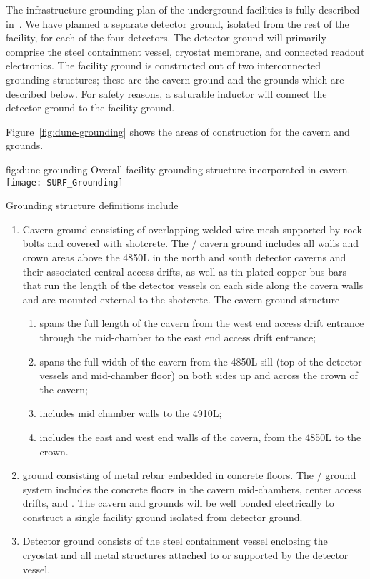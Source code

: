 The infrastructure grounding plan of the underground facilities is
fully described in~\cite{bib:cernedms2095975}. %
We have planned a separate detector ground, isolated from the rest of the facility, for each of the four detectors.  %
The detector ground will primarily 
comprise the steel containment vessel, cryostat membrane, and
connected readout electronics.  The facility ground is constructed out
of two interconnected grounding structures; these are the cavern
ground and the  grounds which are described below.  For safety
reasons, a saturable inductor will connect the detector ground to the
facility ground.

Figure~\ref{fig:dune-grounding} shows the areas of construction for
the cavern and  grounds.
\begin{dunefigure}{fig:dune-grounding}
  {Overall  facility grounding structure incorporated in cavern.}
  \texttt{[image: SURF\_Grounding]}
\end{dunefigure}
Grounding structure definitions include 
\begin{enumerate}
 \item Cavern ground consisting of overlapping welded wire mesh
   supported by rock bolts and covered with shotcrete. The
   / cavern ground includes all walls and
   crown areas above the 4850L in the north and south detector
   caverns and their associated central access drifts, as well as tin-plated
   copper bus bars that run the length of the detector vessels
   on each side along the cavern walls and are mounted external to the
   shotcrete.  The cavern ground structure
\begin{enumerate}
 \item spans the full length of the cavern from the west end access
   drift entrance through the mid-chamber to the east end access drift
   entrance;
 \item spans the full width of the cavern from the 4850L sill
   (top of the detector vessels and mid-chamber floor) on both sides
   up and across the crown of the cavern;
 \item includes mid chamber walls to the 4910L;
 \item includes the east and west end walls of the cavern, from the
   4850L to the crown.
\end{enumerate}
 \item {} ground consisting of metal rebar embedded in
   concrete floors. The /  ground
   system includes the concrete floors in the cavern mid-chambers,
   center access drifts, and . The cavern and
    grounds will be well bonded electrically to construct
   a single facility ground isolated from detector ground.
 \item Detector ground consists of the steel containment vessel
   enclosing the cryostat and all metal structures attached to or
   supported by the detector vessel.
\end{enumerate}


